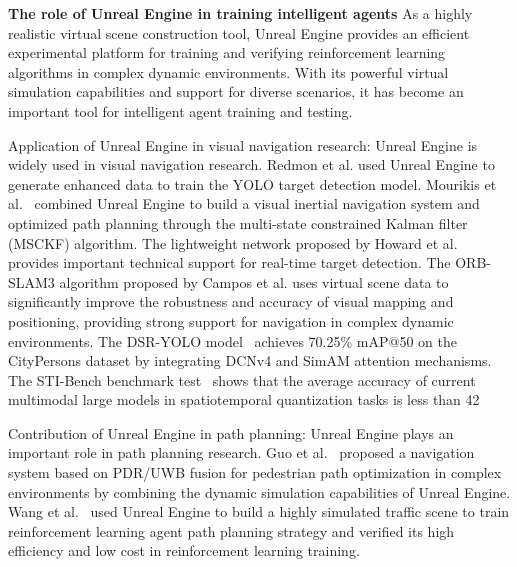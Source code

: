 \documentclass[lettersize,journal]{IEEEtran}
\begin{document}


\textbf{The role of Unreal Engine in training intelligent agents}
As a highly realistic virtual scene construction tool, Unreal Engine provides an efficient experimental platform for training and verifying reinforcement learning algorithms in complex dynamic environments. 
With its powerful virtual simulation capabilities and support for diverse scenarios, it has become an important tool for intelligent agent training and testing.


Application of Unreal Engine in visual navigation research: 
Unreal Engine is widely used in visual navigation research. 
Redmon et al.\cite{redmon2017yolo9000} used Unreal Engine to generate enhanced data to train the YOLO target detection model. 
Mourikis et al.~\cite{mourikis2007multi} combined Unreal Engine to build a visual inertial navigation system and optimized path planning through the multi-state constrained Kalman filter (MSCKF) algorithm. 
The lightweight network proposed by Howard et al.\cite{howard2017mobilenets} provides important technical support for real-time target detection. 
The ORB-SLAM3 algorithm proposed by Campos et al.\cite{campos2021orb} uses virtual scene data to significantly improve the robustness and accuracy of visual mapping and positioning, providing strong support for navigation in complex dynamic environments. 
The DSR-YOLO model~\cite{oussouaddi2025dsr} achieves 70.25\% mAP@50 on the CityPersons dataset by integrating DCNv4 and SimAM attention mechanisms. 
The STI-Bench benchmark test~\cite{li2025sti} shows that the average accuracy of current multimodal large models in spatiotemporal quantization tasks is less than 42%


Contribution of Unreal Engine in path planning: 
Unreal Engine plays an important role in path planning research. 
Guo et al.~\cite{guo2020improved} proposed a navigation system based on PDR/UWB fusion for pedestrian path optimization in complex environments by combining the dynamic simulation capabilities of Unreal Engine. 
Wang et al.~\cite{wang2022llio} used Unreal Engine to build a highly simulated traffic scene to train reinforcement learning agent path planning strategy and verified its high efficiency and low cost in reinforcement learning training.
\end{document}
